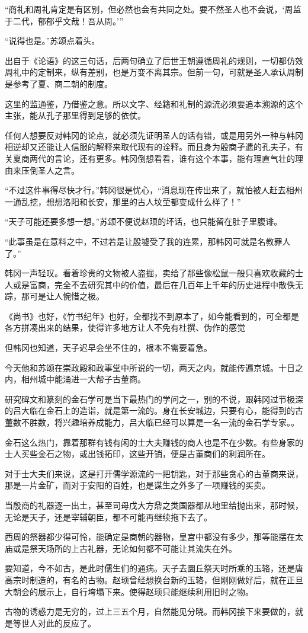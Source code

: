 “商礼和周礼肯定是有区别，但必然也会有共同之处。要不然圣人也不会说，‘周监于二代，郁郁乎文哉！吾从周。’”

“说得也是。”苏颂点着头。

出自于《论语》的这三句话，后两句确立了后世王朝遵循周礼的规则，一切都仿效周礼中的定制来，纵有差别，也是万变不离其宗。但前一句，可就是圣人承认周制是参考了夏、商二朝的制度。

这里的监通鉴，乃借鉴之意。所以文字、经籍和礼制的源流必须要追本溯源的这个主张，能从孔子那里得到足够的依仗。

任何人想要反对韩冈的论点，就必须先证明圣人的话有错，或是用另外一种与韩冈相逆却又还能让人信服的解释来取代现有的诠释。而且身为殷商孑遗的孔夫子，有关夏商两代的言论，还有更多。韩冈倒想看看，谁有这个本事，能有理直气壮的理由来压倒圣人之言。

“不过这件事得尽快才行。”韩冈很是忧心，“消息现在传出来了，就怕被人赶去相州一通乱挖，想想洛阳和长安，那里的古人坟茔都变成什么样了！”

“天子可能还要多想一想。”苏颂不便说赵顼的坏话，也只能留在肚子里腹诽。

“此事虽是在意料之中，不过若是让殷墟受了我的连累，那韩冈可就是名教罪人了。”

韩冈一声轻叹。看着珍贵的文物被人盗掘，卖给了那些像松鼠一般只喜欢收藏的士人或是富商，完全不去研究其中的价值，最后在几百年上千年的历史进程中散佚无踪，那可是让人惋惜之极。

《尚书》也好，《竹书纪年》也好，全都找不到原本了，如今能看到的，可全都是各方拼凑出来的结果，使得许多地方让人不免有杜撰、伪作的感觉

但韩冈也知道，天子迟早会坐不住的，根本不需要着急。

今天他和苏颂在崇政殿和政事堂中所说的一切，两天之内，就能传遍京城。十日之内，相州城中能涌进一大帮子古董商。

研究碑文和篆刻的金石学可是当下最热门的学问之一，别的不说，跟韩冈过节极深的吕大临在金石上的造诣，就是第一流的。身在长安城边，只要有心，能得到的古董数不胜数，将兴趣培养成能力，吕大临已经可以算是一名一流的金石学专家。。

金石这么热门，靠着那群有钱有闲的士大夫赚钱的商人也是不在少数。有些身家的士人买些金石之物，或出钱拓印，这些开销，便是古董商们的利润所在。

对于士大夫们来说，这是打开儒学源流的一把钥匙，对于那些贪心的古董商来说，那是一片金矿，而对于安阳的百姓，也是谋生之外多了一项赚钱的买卖。

当殷商的礼器逐一出土，甚至司母戊大方鼎之类国器都从地里给抛出来，那时候，无论是天子，还是宰辅朝臣，都不可能再继续拖下去了。

西周的祭器都少得可怜，能确定是商朝的器物，皇宫中都没有多少，那等能摆在太庙或是祭天场所的上古礼器，无论如何都不可能让其流失在外。

要知道，今不如古，是此时儒生们的通病。天子去圜丘祭天时所乘的玉辂，还是唐高宗时制造的，有名的古物。赵顼曾经想换台新的玉辂，但刚刚做好后，就在正旦大朝会的展示上，自行垮塌下来。使得赵顼只能继续利用旧时之物。

古物的诱惑力是无穷的，过上三五个月，自然能见分晓。而韩冈接下来要做的，就是等世人对此的反应了。

